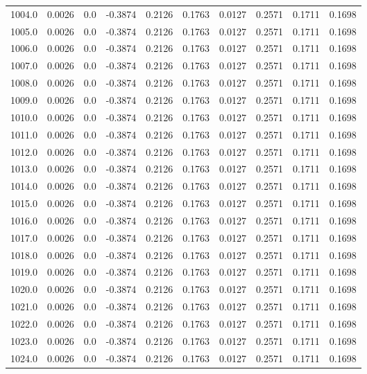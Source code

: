 \begin{longtable}{lrrrrrrrrr}
1004.0 & 0.0026 & 0.0 & -0.3874 & 0.2126 & 0.1763 & 0.0127 & 0.2571 & 0.1711 & 0.1698 \\
1005.0 & 0.0026 & 0.0 & -0.3874 & 0.2126 & 0.1763 & 0.0127 & 0.2571 & 0.1711 & 0.1698 \\
1006.0 & 0.0026 & 0.0 & -0.3874 & 0.2126 & 0.1763 & 0.0127 & 0.2571 & 0.1711 & 0.1698 \\
1007.0 & 0.0026 & 0.0 & -0.3874 & 0.2126 & 0.1763 & 0.0127 & 0.2571 & 0.1711 & 0.1698 \\
1008.0 & 0.0026 & 0.0 & -0.3874 & 0.2126 & 0.1763 & 0.0127 & 0.2571 & 0.1711 & 0.1698 \\
1009.0 & 0.0026 & 0.0 & -0.3874 & 0.2126 & 0.1763 & 0.0127 & 0.2571 & 0.1711 & 0.1698 \\
1010.0 & 0.0026 & 0.0 & -0.3874 & 0.2126 & 0.1763 & 0.0127 & 0.2571 & 0.1711 & 0.1698 \\
1011.0 & 0.0026 & 0.0 & -0.3874 & 0.2126 & 0.1763 & 0.0127 & 0.2571 & 0.1711 & 0.1698 \\
1012.0 & 0.0026 & 0.0 & -0.3874 & 0.2126 & 0.1763 & 0.0127 & 0.2571 & 0.1711 & 0.1698 \\
1013.0 & 0.0026 & 0.0 & -0.3874 & 0.2126 & 0.1763 & 0.0127 & 0.2571 & 0.1711 & 0.1698 \\
1014.0 & 0.0026 & 0.0 & -0.3874 & 0.2126 & 0.1763 & 0.0127 & 0.2571 & 0.1711 & 0.1698 \\
1015.0 & 0.0026 & 0.0 & -0.3874 & 0.2126 & 0.1763 & 0.0127 & 0.2571 & 0.1711 & 0.1698 \\
1016.0 & 0.0026 & 0.0 & -0.3874 & 0.2126 & 0.1763 & 0.0127 & 0.2571 & 0.1711 & 0.1698 \\
1017.0 & 0.0026 & 0.0 & -0.3874 & 0.2126 & 0.1763 & 0.0127 & 0.2571 & 0.1711 & 0.1698 \\
1018.0 & 0.0026 & 0.0 & -0.3874 & 0.2126 & 0.1763 & 0.0127 & 0.2571 & 0.1711 & 0.1698 \\
1019.0 & 0.0026 & 0.0 & -0.3874 & 0.2126 & 0.1763 & 0.0127 & 0.2571 & 0.1711 & 0.1698 \\
1020.0 & 0.0026 & 0.0 & -0.3874 & 0.2126 & 0.1763 & 0.0127 & 0.2571 & 0.1711 & 0.1698 \\
1021.0 & 0.0026 & 0.0 & -0.3874 & 0.2126 & 0.1763 & 0.0127 & 0.2571 & 0.1711 & 0.1698 \\
1022.0 & 0.0026 & 0.0 & -0.3874 & 0.2126 & 0.1763 & 0.0127 & 0.2571 & 0.1711 & 0.1698 \\
1023.0 & 0.0026 & 0.0 & -0.3874 & 0.2126 & 0.1763 & 0.0127 & 0.2571 & 0.1711 & 0.1698 \\
1024.0 & 0.0026 & 0.0 & -0.3874 & 0.2126 & 0.1763 & 0.0127 & 0.2571 & 0.1711 & 0.1698 \\

\end{longtable}
